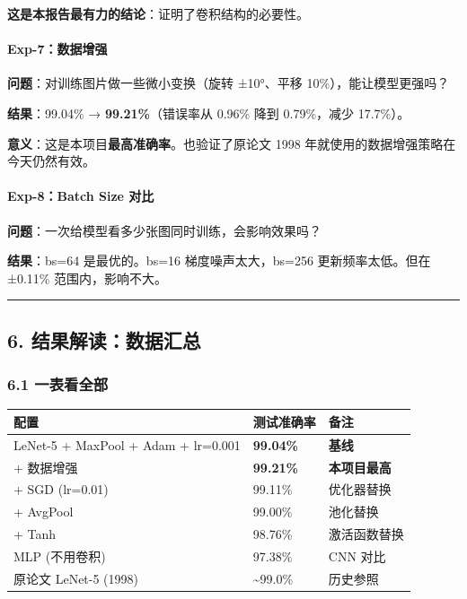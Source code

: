 \documentclass[
  11pt,
]{ctexart}
\newcounter{none} %
\begin{document}
\textbf{这是本报告最有力的结论}：证明了卷积结构的必要性。

\paragraph{Exp-7：数据增强}\label{exp-7ux6570ux636eux589eux5f3a}

\textbf{问题}：对训练图片做一些微小变换（旋转 ±10°、平移
10\%），能让模型更强吗？

\textbf{结果}：99.04\% → \textbf{99.21\%}（错误率从 0.96\% 降到
0.79\%，减少 17.7\%）。

\textbf{意义}：这是本项目\textbf{最高准确率}。也验证了原论文 1998
年就使用的数据增强策略在今天仍然有效。

\paragraph{Exp-8：Batch Size 对比}\label{exp-8batch-size-ux5bf9ux6bd4}

\textbf{问题}：一次给模型看多少张图同时训练，会影响效果吗？

\textbf{结果}：bs=64 是最优的。bs=16 梯度噪声太大，bs=256
更新频率太低。但在 ±0.11\% 范围内，影响不大。

\begin{center}\rule{0.5\linewidth}{0.5pt}\end{center}

\subsection{6.
结果解读：数据汇总}\label{ux7ed3ux679cux89e3ux8bfbux6570ux636eux6c47ux603b}

\subsubsection{6.1 一表看全部}\label{ux4e00ux8868ux770bux5168ux90e8}

{\def\LTcaptype{none} %
\begin{longtable}[]{@{}lll@{}}
\toprule\noalign{}
配置 & 测试准确率 & 备注 \\
\midrule\noalign{}
\endhead
\bottomrule\noalign{}
\endlastfoot
LeNet-5 + MaxPool + Adam + lr=0.001 & \textbf{99.04\%} &
\textbf{基线} \\
+ 数据增强 & \textbf{99.21\%} & \textbf{本项目最高} \\
+ SGD (lr=0.01) & 99.11\% & 优化器替换 \\
+ AvgPool & 99.00\% & 池化替换 \\
+ Tanh & 98.76\% & 激活函数替换 \\
MLP (不用卷积) & 97.38\% & CNN 对比 \\
原论文 LeNet-5 (1998) & \textasciitilde99.0\% & 历史参照 \\
\end{longtable}
}
\end{document}
